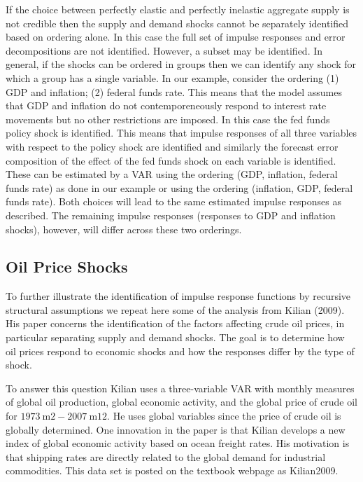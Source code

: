 \documentclass[10pt]{article}
\begin{document}
If the choice between perfectly elastic and perfectly inelastic aggregate supply is not credible then the supply and demand shocks cannot be separately identified based on ordering alone. In this case the full set of impulse responses and error decompositions are not identified. However, a subset may be identified. In general, if the shocks can be ordered in groups then we can identify any shock for which a group has a single variable. In our example, consider the ordering (1) GDP and inflation; (2) federal funds rate. This means that the model assumes that GDP and inflation do not contemporeneously respond to interest rate movements but no other restrictions are imposed. In this case the fed funds policy shock is identified. This means that impulse responses of all three variables with respect to the policy shock are identified and similarly the forecast error composition of the effect of the fed funds shock on each variable is identified. These can be estimated by a VAR using the ordering (GDP, inflation, federal funds rate) as done in our example or using the ordering (inflation, GDP, federal funds rate). Both choices will lead to the same estimated impulse responses as described. The remaining impulse responses (responses to GDP and inflation shocks), however, will differ across these two orderings.

\subsection{Oil Price Shocks}
To further illustrate the identification of impulse response functions by recursive structural assumptions we repeat here some of the analysis from Kilian (2009). His paper concerns the identification of the factors affecting crude oil prices, in particular separating supply and demand shocks. The goal is to determine how oil prices respond to economic shocks and how the responses differ by the type of shock.

To answer this question Kilian uses a three-variable VAR with monthly measures of global oil production, global economic activity, and the global price of crude oil for $1973 \mathrm{~m} 2-2007 \mathrm{~m} 12$. He uses global variables since the price of crude oil is globally determined. One innovation in the paper is that Kilian develops a new index of global economic activity based on ocean freight rates. His motivation is that shipping rates are directly related to the global demand for industrial commodities. This data set is posted on the textbook webpage as Kilian2009.
\end{document}
